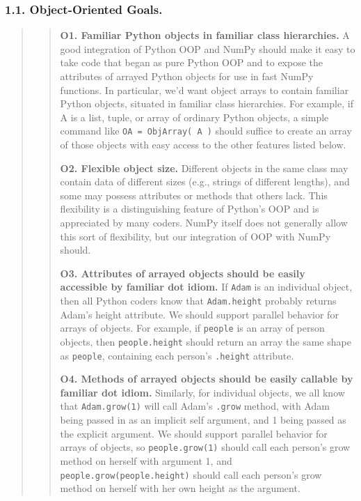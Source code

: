 \documentclass[letterpaper,compsoc,twoside]{IEEEtran}
\begin{document}
\subsubsection{1.1. Object-Oriented Goals.%
  \label{object-oriented-goals}%
}
\begin{quotation}%
\begin{quote}


\textbf{O1.  Familiar Python objects in familiar class hierarchies.} A good integration of Python OOP and NumPy should make it easy to take code that began as pure Python OOP and to expose the attributes of arrayed Python objects for use in fast NumPy functions.  In particular, we'd want object arrays to contain familiar Python objects, situated in familiar class hierarchies.  For example, if A is a list, tuple, or array of ordinary Python objects, a simple command like \texttt{OA = ObjArray( A )} should suffice to create an array of those objects with easy access to the other features listed below.

\textbf{O2.  Flexible object size.}  Different objects in the same class may contain data of different sizes (e.g., strings of different lengths), and some may possess attributes or methods that others lack.  This flexibility is a distinguishing feature of Python's OOP and is appreciated by many coders.  NumPy itself does not generally allow this sort of flexibility, but our integration of OOP with NumPy should.

\textbf{O3.  Attributes of arrayed objects should be easily accessible by familiar dot idiom.}  If \texttt{Adam} is an individual object, then all Python coders know that \texttt{Adam.height} probably returns Adam's height attribute.  We should support parallel behavior for arrays of objects.  For example, if \texttt{people} is an array of person objects, then \texttt{people.height} should return an array the same shape as \texttt{people}, containing each person's \texttt{.height} attribute.

\textbf{O4.  Methods of arrayed objects should be easily callable by familiar dot idiom.}  Similarly, for individual objects, we all know that \texttt{Adam.grow(1)} will call Adam's \texttt{.grow} method, with Adam being passed in as an implicit \textquotedbl{}self\textquotedbl{} argument, and 1 being passed as the explicit argument.  We should support parallel behavior for arrays of objects, so \texttt{people.grow(1)} should call each person's grow method on herself with argument 1, and \texttt{people.grow(people.height)} should call each person's grow method on herself with her own height as the argument.
\end{quote}
\end{quotation}
\end{document}
